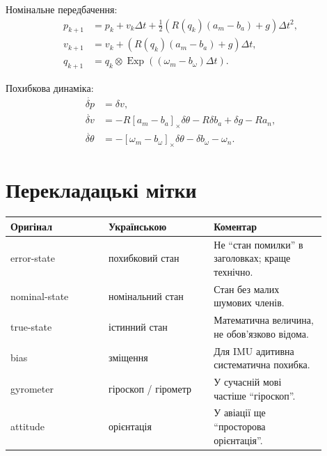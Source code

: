 \documentclass[11pt,a4paper]{article}
\newcommand{\Exp}{\operatorname{Exp}}
\newcommand{\qmul}{\otimes}
\newcommand{\hatmap}[1]{\left[#1\right]_\times}
\newcommand{\dt}{\Delta t}
\begin{document}
Номінальне передбачення:
\begin{align}
p_{k+1} &= p_k+v_k\dt+\frac12(R(q_k)(a_m-b_a)+g)\dt^2,\\
v_{k+1} &= v_k+(R(q_k)(a_m-b_a)+g)\dt,\\
q_{k+1} &= q_k\qmul\Exp((\omega_m-b_\omega)\dt).
\end{align}

Похибкова динаміка:
\begin{align}
\dot{\delta p}&=\delta v,\\
\dot{\delta v}&=-R\hatmap{a_m-b_a}\delta\theta-R\delta b_a+\delta g-Ra_n,\\
\dot{\delta\theta}&=-\hatmap{\omega_m-b_\omega}\delta\theta-\delta b_\omega-\omega_n.
\end{align}

\section{Перекладацькі мітки}

\begin{longtable}{p{0.28\linewidth}p{0.30\linewidth}p{0.32\linewidth}}
\toprule
Оригінал & Українською & Коментар\\
\midrule
error-state & похибковий стан & Не ``стан помилки'' в заголовках; краще технічно.\\
nominal-state & номінальний стан & Стан без малих шумових членів.\\
true-state & істинний стан & Математична величина, не обов'язково відома.\\
bias & зміщення & Для IMU адитивна систематична похибка.\\
gyrometer & гіроскоп / гірометр & У сучасній мові частіше ``гіроскоп''.\\
attitude & орієнтація & У авіації ще ``просторова орієнтація''.\\
\bottomrule
\end{longtable}
\end{document}
